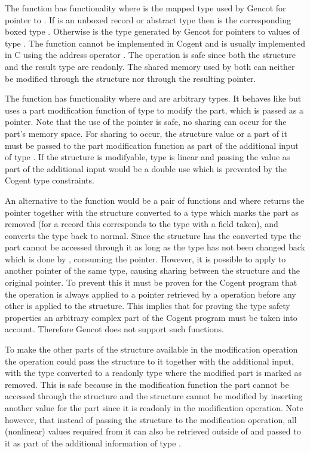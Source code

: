 The function  has functionality  where  is the mapped type used by Gencot
for pointer to . If  is an unboxed record or abstract type  then  is the
corresponding boxed type . Otherwise  is the type  generated by Gencot for pointers
to values of type . The function cannot be implemented in Cogent and is usually implemented in C using the address 
operator \code{\&}. The operation is safe since both the structure and the result type are readonly. The shared
memory used by both can neither be modified through the structure nor through the resulting pointer. 

The function  has functionality  where  and  are
arbitrary types. It behaves like  but uses a part modification function of
type  to modify the part, which is passed as a pointer.
Note that the use of the pointer is safe, no sharing can occur for the part's memory
space. For sharing to occur, the structure value or a part of it must be passed to the part modification function as
part of the additional input of type . If the structure is modifyable, type  is linear and passing 
the value as part of the additional input would be a double use which is prevented by the Cogent type constraints.

An alternative to the function  would be a pair of functions  and  where 
returns the pointer together with the structure converted to a type which marks the part as removed (for a record this
corresponds to the type with a field taken), and  converts the type back to normal. 
Since the structure has the converted type the part cannot be accessed through it
as long as the type has not been changed back which is done by , consuming the pointer.
However, it is possible to apply  to another pointer of the same type, causing sharing between the 
structure and the original pointer. To prevent this it must be proven for the Cogent program that the 
operation is always applied to a pointer retrieved by a  operation before any other 
is applied to the structure. This implies that
for proving the type safety properties an arbitrary complex part of the Cogent program must be taken into
account. Therefore Gencot does not support such functions.

To make the other parts of the structure available in the modification operation the  operation could
pass the structure to it together with the additional input, with the type converted to a readonly type where the modified
part is marked as removed. This is safe because in the modification function the part cannot be accessed
through the structure and the structure cannot be modified by inserting another value for the part since it is
readonly in the modification operation. Note however, that instead of passing the structure to the modification operation,
all (nonlinear) values required from it can also be retrieved outside of  and passed to it as part of the 
additional information of type .

